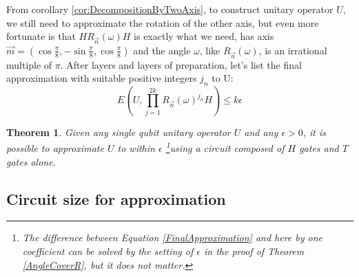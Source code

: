 \documentclass[a4paper,10pt]{book}
\newtheorem{theorem}{Theorem}[section]
\numberwithin{equation}{section}
\begin{document}
From corollary \ref{cor:DecompositionByTwoAxis}, to construct unitary operator $U$, we still need to approximate the rotation of the other axis, but even more fortunate is that $HR_{\vec{n}}(\omega)H$ is exactly what we need, has axis $\vec{m} = (\cos\frac{\pi}{8},-\sin\frac{\pi}{8},\cos\frac{\pi}{8})$ and the angle $\omega$, like $R_{\vec{n}}(\omega)$, is an irrational multiple of $\pi$. After layers and layers of preparation, let's list the final approximation with suitable positive integers $j_{n}$ to U:
\begin{equation}\label{FinalApproximation}
    E(U,\prod_{j=1}^{2k}R_{\vec{n}}(\omega)^{j_{n}}H) \leq k\epsilon
\end{equation}
\begin{theorem}
    Given any single qubit unitary operator $U$ and any $\epsilon > 0$, it is possible to approximate $U$ to within $\epsilon$ \footnote{The difference between Equation \ref{FinalApproximation} and here by one coefficient can be solved by the setting of $\epsilon$ in the proof of Theorem \ref{AngleCoverR}, but it does not matter. }using a circuit composed of $H$ gates and $T$ gates alone.
\end{theorem}



\subsection{Circuit size for approximation}
\end{document}
